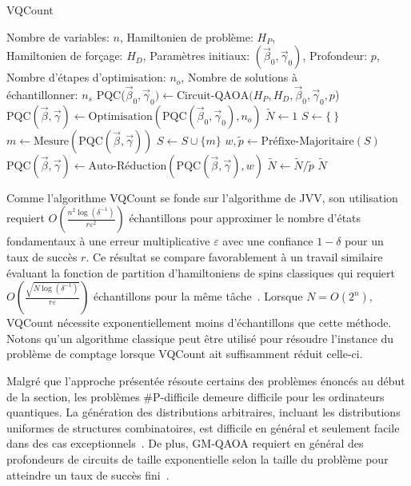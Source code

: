 \begin{algorithm}[h!]
    \caption{VQCount}\label{alg:vqcount}
    \begin{algorithmic}[1]
    \REQUIRE Nombre de variables: $n$, Hamiltonien de problème: $H_P$,\\Hamiltonien de forçage: $H_D$, Paramètres initiaux: $(\vec{\beta}_0, \vec{\gamma}_0)$, Profondeur: $p$, Nombre d'étapes d'optimisation: $n_{o}$, Nombre de solutions à\\échantillonner: $n_s$
    \STATE PQC($\vec{\beta}_0, \vec{\gamma}_0) \leftarrow \text{Circuit-QAOA}(H_P, H_D, \vec{\beta}_0, \vec{\gamma}_0, p$)
    \STATE $\text{PQC}(\vec{\beta}, \vec{\gamma}) \leftarrow \text{Optimisation}(\text{PQC}(\vec{\beta}_0, \vec{\gamma}_0), n_{o})$
    \STATE $\tilde{N} \leftarrow 1$
    \STATE $S \leftarrow \{ \ \}$
    \STATE $m \leftarrow \text{Mesure}(\text{PQC}(\vec{\beta}, \vec{\gamma}))$
    \STATE $S \leftarrow S \cup \{m\}$
    \ENDIF
    \ENDWHILE
    \STATE $w, \tilde{p} \leftarrow \text{Préfixe-Majoritaire}(S)$
    \STATE $\text{PQC}(\vec{\beta}, \vec{\gamma}) \leftarrow \text{Auto-Réduction}(\text{PQC}(\vec{\beta}, \vec{\gamma}), w)$
    \STATE $\tilde{N} \leftarrow \tilde{N} / \tilde{p}$
    \ENDFOR
    \RETURN $\tilde{N}$
\end{algorithmic}
\end{algorithm}
    
Comme l'algorithme VQCount se fonde sur l'algorithme de JVV, son utilisation requiert $O(\frac{n^{2} \log (\delta^{-1})}{r \varepsilon^{2}})$ échantillons pour approximer le nombre d'états fondamentaux à une erreur multiplicative $\varepsilon$ avec une confiance $1 - \delta$ pour un taux de succès $r$. Ce résultat se compare favorablement à un travail similaire évaluant la fonction de partition d'hamiltoniens de spins classiques qui requiert $O(\frac{\sqrt{N \log(\delta^{-1})}}{r \varepsilon})$ échantillons pour la même tâche~\cite{sundarQuantumAlgorithmCount2019}. Lorsque $N=O(2^{n})$, VQCount nécessite exponentiellement moins d'échantillons que cette méthode. Notons qu'un algorithme classique peut être utilisé pour résoudre l'instance du problème de comptage lorsque VQCount ait suffisamment réduit celle-ci.

Malgré que l'approche présentée résoute certains des problèmes énoncés au début de la section, les problèmes \textsf{\#P}-difficile demeure difficile pour les ordinateurs quantiques. La génération des distributions arbitraires, incluant les distributions uniformes de structures combinatoires, est difficile en général et seulement facile dans des cas exceptionnels~\cite{aaronsonComputationalComplexityLinear2011, boulandComplexityVerificationQuantum2019}. De plus, GM-QAOA requiert en général des profondeurs de circuits de taille exponentielle selon la taille du problème pour atteindre un taux de succès fini~\cite{xiePerformanceUpperBound2025}. 

